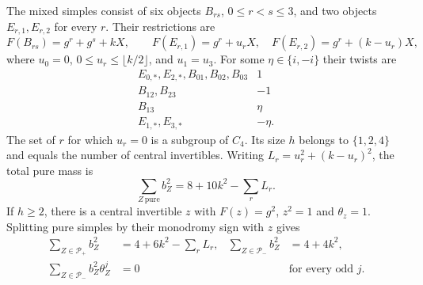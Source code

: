 \begin{lemma}\label{lem:ng-support}
The mixed simples consist of six objects $B_{rs}$, $0\le r<s\le3$,
and two objects $E_{r,1},E_{r,2}$ for every $r$. Their restrictions are
\[
 F(B_{rs})=g^r+g^s+kX,\qquad
 F(E_{r,1})=g^r+u_rX,\quad F(E_{r,2})=g^r+(k-u_r)X,
\]
where $u_0=0$, $0\le u_r\le\lfloor k/2\rfloor$, and $u_1=u_3$.
For some $\eta\in\{i,-i\}$ their twists are
\begin{equation}\label{eq:ng-twists}
\begin{array}{c|c}
 E_{0,*},E_{2,*},B_{01},B_{02},B_{03}&1\\
 B_{12},B_{23}&-1\\
 B_{13}&\eta\\
 E_{1,*},E_{3,*}&-\eta.
\end{array}
\end{equation}
The set of $r$ for which $u_r=0$ is a subgroup of $C_4$. Its size
$h$ belongs to $\{1,2,4\}$ and equals the number of central invertibles.
Writing $L_r=u_r^2+(k-u_r)^2$, the total pure mass is
\begin{equation}\label{eq:ng-pure}
 \sum_{Z\,\mathrm{pure}}b_Z^2=8+10k^2-\sum_rL_r.
\end{equation}
If $h\ge2$, there is a central invertible $z$ with $F(z)=g^2$, $z^2=1$
and $\theta_z=1$. Splitting pure simples by their monodromy sign with
$z$ gives
\begin{align}
 \sum_{Z\in\mathcal P_+}b_Z^2&=4+6k^2-\sum_rL_r,
 &\sum_{Z\in\mathcal P_-}b_Z^2&=4+4k^2,\label{eq:ng-split}\\
 \sum_{Z\in\mathcal P_-}b_Z^2\theta_Z^j&=0
 &&\text{for every odd }j.\label{eq:ng-odd}
\end{align}
\end{lemma}

